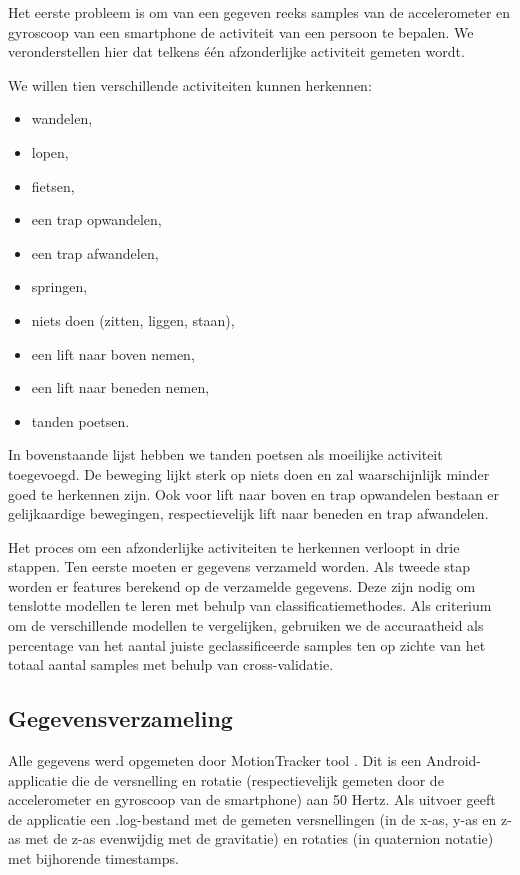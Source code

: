 \documentclass{article}
\begin{document}
Het eerste probleem is om van een gegeven reeks samples van de accelerometer en gyroscoop van een smartphone de activiteit van een persoon te bepalen. We veronderstellen hier dat telkens \'e\'en afzonderlijke activiteit gemeten wordt.

We willen tien verschillende activiteiten kunnen herkennen:
\begin{itemize}
\item wandelen,
\item lopen,
\item fietsen,
\item een trap opwandelen,
\item een trap afwandelen,
\item springen,
\item niets doen (zitten, liggen, staan),
\item een lift naar boven nemen, %
\item een lift naar beneden nemen,
\item tanden poetsen.
\end{itemize}

In bovenstaande lijst hebben we tanden poetsen als moeilijke activiteit toegevoegd. De beweging lijkt sterk op niets doen en zal waarschijnlijk minder goed te herkennen zijn. Ook voor lift naar boven en trap opwandelen bestaan er gelijkaardige bewegingen, respectievelijk lift naar beneden en trap afwandelen.

Het proces om een afzonderlijke activiteiten te herkennen verloopt in drie stappen. Ten eerste moeten er gegevens verzameld worden. Als tweede stap worden er features berekend op de verzamelde gegevens. Deze zijn nodig om tenslotte modellen te leren met behulp van classificatiemethodes. Als criterium om de verschillende modellen te vergelijken, gebruiken we de accuraatheid als percentage van het aantal juiste geclassificeerde samples ten op zichte van het totaal aantal samples met behulp van cross-validatie.


\subsection{Gegevensverzameling}

Alle gegevens werd opgemeten door MotionTracker tool %
. Dit is een Android-applicatie die de versnelling en rotatie (respectievelijk gemeten door de accelerometer en gyroscoop van de smartphone) aan 50 Hertz.  Als uitvoer geeft de applicatie een .log-bestand met de gemeten versnellingen (in de x-as, y-as en z-as met de z-as evenwijdig met de gravitatie) en rotaties (in quaternion notatie) met bijhorende timestamps.
\end{document}
